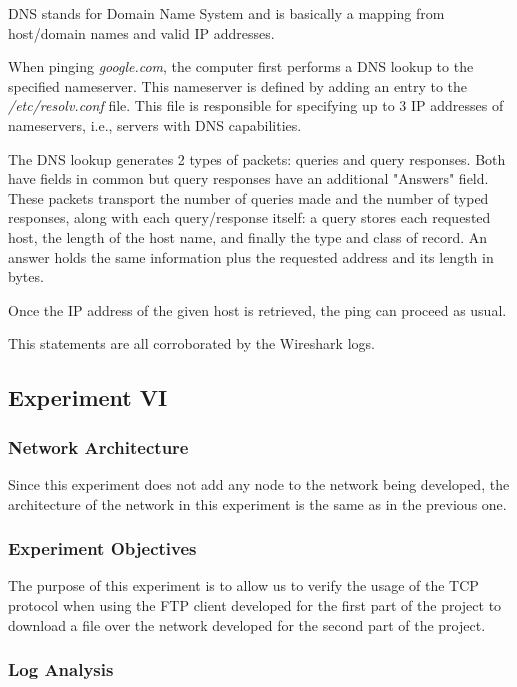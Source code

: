 \documentclass[11pt,a4paper,twocolumn]{article}
\begin{document}
DNS stands for Domain Name System and is basically a mapping from host/domain names and valid IP addresses.

When pinging \textit{google.com}, the computer first performs a DNS lookup to the specified nameserver. This nameserver is defined by adding an entry to the \textit{/etc/resolv.conf} file. This file is responsible for specifying up to 3 IP addresses of nameservers, i.e., servers with DNS capabilities.

The DNS lookup generates 2 types of packets: queries and query responses. Both have fields in common but query responses have an additional "Answers" field. These packets transport the number of queries made and the number of typed responses, along with each query/response itself: a query stores each requested host, the length of the host name, and finally the type and class of record. An answer holds the same information plus the requested address and its length in bytes.

Once the IP address of the given host is retrieved, the ping can proceed as usual.

This statements are all corroborated by the Wireshark logs.

\subsection{Experiment VI}

\subsubsection{Network Architecture}

Since this experiment does not add any node to the network being developed, the architecture of the network in this experiment is the same as in the previous one.

\subsubsection{Experiment Objectives}

The purpose of this experiment is to allow us to verify the usage of the TCP protocol when using the FTP client developed for the first part of the project to download a file over the network developed for the second part of the project.

\subsubsection{Log Analysis}
\end{document}
